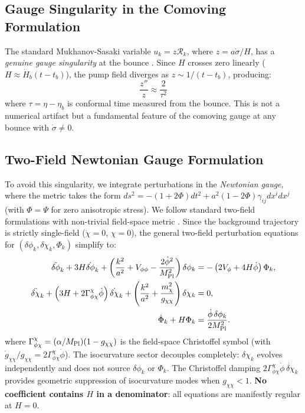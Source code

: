 \documentclass[11pt,a4paper]{article}
\begin{document}
\subsection{Gauge Singularity in the Comoving Formulation}

The standard Mukhanov-Sasaki variable $u_k = z\mathcal{R}_k$, where $z = a\dot\sigma/H$, has a \emph{genuine gauge singularity} at the bounce \cite{Deruelle1995,Peter2008}. Since $H$ crosses zero linearly ($H \approx \dot{H}_b(t-t_b)$), the pump field diverges as $z \sim 1/(t-t_b)$, producing:
\begin{equation}
\frac{z''}{z} \approx \frac{2}{\tau^2}
\end{equation}
where $\tau = \eta - \eta_b$ is conformal time measured from the bounce. This is not a numerical artifact but a fundamental feature of the comoving gauge at any bounce with $\dot\sigma \neq 0$.

\subsection{Two-Field Newtonian Gauge Formulation}

To avoid this singularity, we integrate perturbations in the \emph{Newtonian gauge}, where the metric takes the form $ds^2 = -(1+2\Phi)dt^2 + a^2(1-2\Phi)\gamma_{ij}dx^i dx^j$ (with $\Phi = \Psi$ for zero anisotropic stress). We follow standard two-field formulations with non-trivial field-space metric \cite{Langlois2008,Gong2011}. Since the background trajectory is strictly single-field ($\dot\chi = 0$, $\chi = 0$), the general two-field perturbation equations for $(\delta\phi_k, \delta\chi_k, \Phi_k)$ simplify to:
\begin{align}
\ddot{\delta\phi}_k + 3H\dot{\delta\phi}_k + \left(\frac{k^2}{a^2} + V_{\phi\phi} - \frac{2\dot\phi^2}{M_{\rm Pl}^2}\right)\delta\phi_k &= -\left(2V_\phi + 4H\dot\phi\right)\Phi_k, \label{eq:KG_phi} \\
\ddot{\delta\chi}_k + \left(3H + 2\Gamma^\chi_{\phi\chi}\dot\phi\right)\dot{\delta\chi}_k + \left(\frac{k^2}{a^2} + \frac{m_\chi^2}{g_{\chi\chi}}\right)\delta\chi_k &= 0, \label{eq:KG_chi} \\
\dot\Phi_k + H\Phi_k &= \frac{\dot\phi \,\delta\phi_k}{2M_{\rm Pl}^2}. \label{eq:momentum_constraint}
\end{align}
where $\Gamma^\chi_{\phi\chi} = (\alpha/M_{\rm Pl})(1-g_{\chi\chi})$ is the field-space Christoffel symbol (with $\dot{g}_{\chi\chi}/g_{\chi\chi} = 2\Gamma^\chi_{\phi\chi}\dot\phi$). The isocurvature sector decouples completely: $\delta\chi_k$ evolves independently and does not source $\delta\phi_k$ or $\Phi_k$. The Christoffel damping $2\Gamma^\chi_{\phi\chi}\dot\phi\,\dot{\delta\chi}_k$ provides geometric suppression of isocurvature modes when $g_{\chi\chi} < 1$. \textbf{No coefficient contains $H$ in a denominator}: all equations are manifestly regular at $H=0$.
\end{document}

